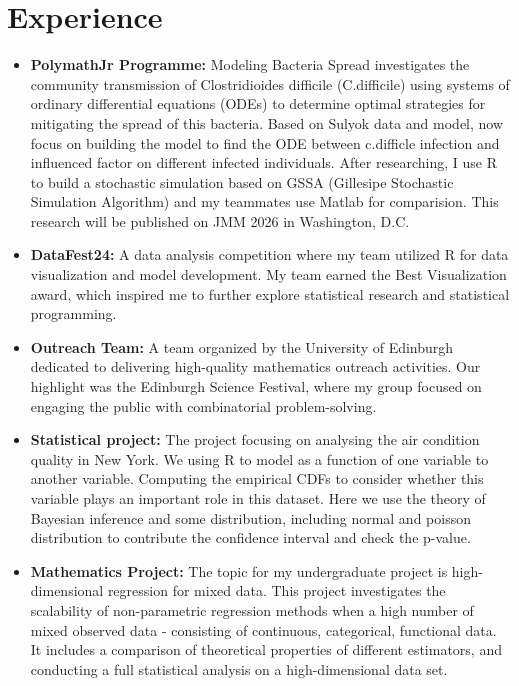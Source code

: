 \documentclass[a4paper,9pt]{extarticle}
\begin{document}
\section{Experience}
\noindent
\begin{itemize}
    \item\textbf{PolymathJr Programme:}
Modeling Bacteria Spread investigates the community transmission of Clostridioides difficile (C.difficile) using systems of ordinary differential equations (ODEs) to determine optimal strategies for mitigating the spread of this bacteria. Based on Sulyok data and model, now focus on building the model to find the ODE between c.difficle infection and influenced factor on different infected individuals. After researching, I use R to build a stochastic simulation based on GSSA (Gillesipe Stochastic Simulation Algorithm) and my teammates use Matlab for comparision. This research will be published on JMM 2026 in Washington, D.C.
    \item \textbf{DataFest24:}
A data analysis competition where my team utilized R for data visualization and model development. My team earned the Best Visualization award, which inspired me to further explore statistical research and statistical programming.
    \item \textbf{Outreach Team:}
A team organized by the University of Edinburgh dedicated to delivering high-quality mathematics outreach activities. Our highlight was the Edinburgh Science Festival, where my group focused on engaging the public with combinatorial problem-solving.
    \item\textbf{Statistical project:}
The project focusing on analysing the air condition quality in New York. We using R to model as a function of one variable to another variable. Computing the empirical CDFs to consider whether this variable plays an important role in this dataset. Here we use the theory of Bayesian inference and some distribution, including normal and poisson distribution to contribute the confidence interval and check the p-value.
    \item \textbf{Mathematics Project:} 
The topic for my undergraduate project is high-dimensional regression for mixed data. This project investigates the scalability of non-parametric regression methods when a high number of mixed observed data - consisting of continuous, categorical, functional data. It includes a comparison of theoretical properties of different estimators, and conducting a full statistical analysis on a high-dimensional data set.
\end{itemize}
\end{document}
